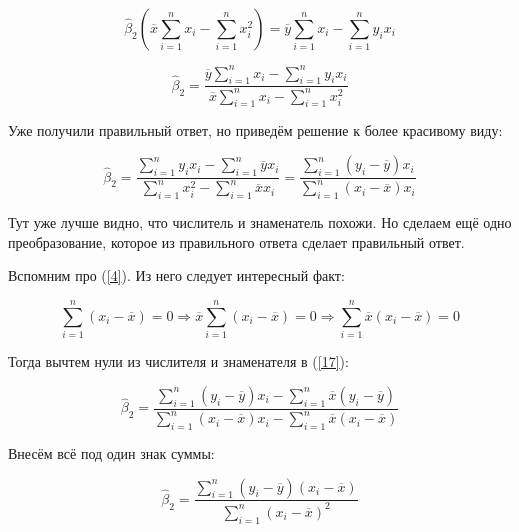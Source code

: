 \documentclass[14pt,a4paper]{scrartcl}
\begin{document}
\begin{equation}\label{15}
	\hat\beta_2 (\overline{x}\sum\limits_{i=1}^{n}x_i - \sum\limits_{i=1}^{n}x_i^2) = \overline{y}\sum\limits_{i=1}^{n}x_i - \sum\limits_{i=1}^{n}y_ix_i
\end{equation}

\begin{equation}\label{16}
	\hat\beta_2 = \frac{\overline{y}\sum\limits_{i=1}^{n}x_i - \sum\limits_{i=1}^{n}y_ix_i}{\overline{x}\sum\limits_{i=1}^{n}x_i - \sum\limits_{i=1}^{n}x_i^2}
\end{equation}

Уже получили правильный ответ, но приведём решение к более красивому виду:

\begin{equation}\label{17}
	\hat\beta_2 = \frac{\sum\limits_{i=1}^{n}y_ix_i - \sum\limits_{i=1}^{n}\overline{y}x_i}{\sum\limits_{i=1}^{n}x_i^2 - \sum\limits_{i=1}^{n}\overline{x}x_i} = \frac{\sum\limits_{i=1}^{n}(y_i - \overline{y})x_i}{\sum\limits_{i=1}^{n}(x_i-\overline{x})x_i}
\end{equation}

Тут уже лучше видно, что числитель и знаменатель похожи. Но сделаем ещё одно преобразование, которое из правильного ответа сделает правильный ответ.

Вспомним про (\ref{4}). Из него следует интересный факт:

\begin{equation}\label{18}
	\sum\limits_{i=1}^{n}(x_i - \overline{x}) = 0 \Longrightarrow \overline{x}\sum\limits_{i=1}^{n}(x_i-\overline{x}) = 0 \Longrightarrow \sum\limits_{i=1}^{n}\overline{x}(x_i-\overline{x}) = 0 
\end{equation}

Тогда вычтем нули из числителя и знаменателя в (\ref{17}):

\begin{equation}\label{19}
	\hat\beta_2 = \frac{\sum\limits_{i=1}^{n}(y_i - \overline{y})x_i - \sum\limits_{i=1}^{n}\overline{x}(y_i-\overline{y})}{\sum\limits_{i=1}^{n}(x_i-\overline{x})x_i - \sum\limits_{i=1}^{n}\overline{x}(x_i-\overline{x})}
\end{equation}

Внесём всё под один знак суммы:

\begin{equation}\label{20}
	\hat\beta_2 = \frac{\sum\limits_{i=1}^{n}(y_i-\overline{y})(x_i-\overline{x})}{\sum\limits_{i=1}^{n}(x_i-\overline{x})^2}
\end{equation}
\end{document}
